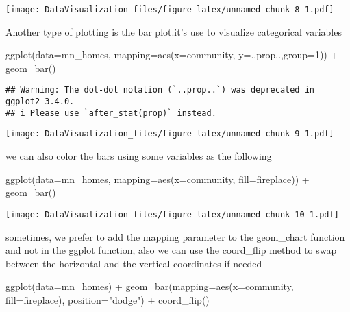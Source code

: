 \documentclass[
]{article}
\newenvironment{Shaded}{\begin{snugshade}}{\end{snugshade}}
\newcommand{\AttributeTok}[1]{\textcolor[rgb]{0.77,0.63,0.00}{#1}}
\newcommand{\DecValTok}[1]{\textcolor[rgb]{0.00,0.00,0.81}{#1}}
\newcommand{\FunctionTok}[1]{\textcolor[rgb]{0.00,0.00,0.00}{#1}}
\newcommand{\NormalTok}[1]{#1}
\newcommand{\SpecialCharTok}[1]{\textcolor[rgb]{0.00,0.00,0.00}{#1}}
\newcommand{\StringTok}[1]{\textcolor[rgb]{0.31,0.60,0.02}{#1}}
\begin{document}
\texttt{[image: DataVisualization\_files/figure-latex/unnamed-chunk-8-1.pdf]}

Another type of plotting is the bar plot.it's use to visualize
categorical variables

\begin{Shaded}
\begin{Highlighting}[]
\FunctionTok{ggplot}\NormalTok{(}\AttributeTok{data=}\NormalTok{mn\_homes, }\AttributeTok{mapping=}\FunctionTok{aes}\NormalTok{(}\AttributeTok{x=}\NormalTok{community, }\AttributeTok{y=}\NormalTok{..prop..,}\AttributeTok{group=}\DecValTok{1}\NormalTok{)) }\SpecialCharTok{+} \FunctionTok{geom\_bar}\NormalTok{()}
\end{Highlighting}
\end{Shaded}

\begin{verbatim}
## Warning: The dot-dot notation (`..prop..`) was deprecated in ggplot2 3.4.0.
## i Please use `after_stat(prop)` instead.
\end{verbatim}

\texttt{[image: DataVisualization\_files/figure-latex/unnamed-chunk-9-1.pdf]}

we can also color the bars using some variables as the following

\begin{Shaded}
\begin{Highlighting}[]
\FunctionTok{ggplot}\NormalTok{(}\AttributeTok{data=}\NormalTok{mn\_homes, }\AttributeTok{mapping=}\FunctionTok{aes}\NormalTok{(}\AttributeTok{x=}\NormalTok{community, }\AttributeTok{fill=}\NormalTok{fireplace)) }\SpecialCharTok{+} \FunctionTok{geom\_bar}\NormalTok{()}
\end{Highlighting}
\end{Shaded}

\texttt{[image: DataVisualization\_files/figure-latex/unnamed-chunk-10-1.pdf]}

sometimes, we prefer to add the mapping parameter to the geom\_chart
function and not in the ggplot function, also we can use the coord\_flip
method to swap between the horizontal and the vertical coordinates if
needed

\begin{Shaded}
\begin{Highlighting}[]
\FunctionTok{ggplot}\NormalTok{(}\AttributeTok{data=}\NormalTok{mn\_homes) }\SpecialCharTok{+} \FunctionTok{geom\_bar}\NormalTok{(}\AttributeTok{mapping=}\FunctionTok{aes}\NormalTok{(}\AttributeTok{x=}\NormalTok{community, }\AttributeTok{fill=}\NormalTok{fireplace), }\AttributeTok{position=}\StringTok{"dodge"}\NormalTok{) }\SpecialCharTok{+} \FunctionTok{coord\_flip}\NormalTok{()}
\end{Highlighting}
\end{Shaded}
\end{document}
